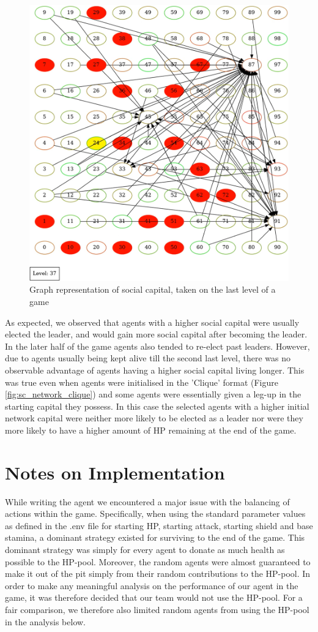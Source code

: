 \begin{figure}[!h]
    \centering
    \includegraphics[width=0.4\linewidth]{004_team_1_agent_design/images/sc_visualisation.png}
    \caption{Graph representation of social capital, taken on the last level of a game}
    \label{fig:sc_visual_img}
\end{figure}

As expected, we observed that agents with a higher social capital were usually elected the leader, and would gain more social capital after becoming the leader. In the later half of the game agents also tended to re-elect past leaders. However, due to agents usually being kept alive till the second last level, there was no observable advantage of agents having a higher social capital living longer. This was true even when agents were initialised in the 'Clique' format (Figure \ref{fig:sc_network_clique}) and some agents were essentially given a leg-up in the starting capital they possess. In this case the selected agents with a higher initial network capital were neither more likely to be elected as a leader nor were they more likely to have a higher amount of HP remaining at the end of the game.

\section{Notes on Implementation}

While writing the agent we encountered a major issue with the balancing of actions within the game. Specifically, when using the standard parameter values as defined in the .env file for starting HP, starting attack, starting shield and base stamina, a dominant strategy existed for surviving to the end of the game. This dominant strategy was simply for every agent to donate as much health as possible to the HP-pool. Moreover, the random agents were almost guaranteed to make it out of the pit simply from their random contributions to the HP-pool. In order to make any meaningful analysis on the performance of our agent in the game, it was therefore decided that our team would not use the HP-pool. For a fair comparison, we therefore also limited random agents from using the HP-pool in the analysis below.

